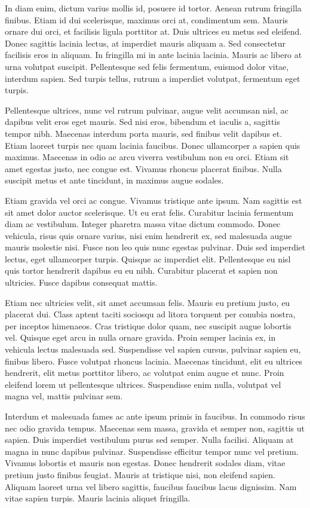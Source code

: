 \documentclass[a4paper,12pt]{report}
\begin{document}
In diam enim, dictum varius mollis id, posuere id tortor. Aenean rutrum fringilla finibus. Etiam id dui scelerisque, maximus orci at, condimentum sem. Mauris ornare dui orci, et facilisis ligula porttitor at. Duis ultrices eu metus sed eleifend. Donec sagittis lacinia lectus, at imperdiet mauris aliquam a. Sed consectetur facilisis eros in aliquam. In fringilla mi in ante lacinia lacinia. Mauris ac libero at urna volutpat suscipit. Pellentesque sed felis fermentum, euismod dolor vitae, interdum sapien. Sed turpis tellus, rutrum a imperdiet volutpat, fermentum eget turpis.

Pellentesque ultrices, nunc vel rutrum pulvinar, augue velit accumsan nisl, ac dapibus velit eros eget mauris. Sed nisi eros, bibendum et iaculis a, sagittis tempor nibh. Maecenas interdum porta mauris, sed finibus velit dapibus et. Etiam laoreet turpis nec quam lacinia faucibus. Donec ullamcorper a sapien quis maximus. Maecenas in odio ac arcu viverra vestibulum non eu orci. Etiam sit amet egestas justo, nec congue est. Vivamus rhoncus placerat finibus. Nulla suscipit metus et ante tincidunt, in maximus augue sodales.

Etiam gravida vel orci ac congue. Vivamus tristique ante ipsum. Nam sagittis est sit amet dolor auctor scelerisque. Ut eu erat felis. Curabitur lacinia fermentum diam ac vestibulum. Integer pharetra massa vitae dictum commodo. Donec vehicula, risus quis ornare varius, nisi enim hendrerit ex, sed malesuada augue mauris molestie nisi. Fusce non leo quis nunc egestas pulvinar. Duis sed imperdiet lectus, eget ullamcorper turpis. Quisque ac imperdiet elit. Pellentesque eu nisl quis tortor hendrerit dapibus eu eu nibh. Curabitur placerat et sapien non ultricies. Fusce dapibus consequat mattis.

Etiam nec ultricies velit, sit amet accumsan felis. Mauris eu pretium justo, eu placerat dui. Class aptent taciti sociosqu ad litora torquent per conubia nostra, per inceptos himenaeos. Cras tristique dolor quam, nec suscipit augue lobortis vel. Quisque eget arcu in nulla ornare gravida. Proin semper lacinia ex, in vehicula lectus malesuada sed. Suspendisse vel sapien cursus, pulvinar sapien eu, finibus libero. Fusce volutpat rhoncus lacinia. Maecenas tincidunt, elit eu ultrices hendrerit, elit metus porttitor libero, ac volutpat enim augue et nunc. Proin eleifend lorem ut pellentesque ultrices. Suspendisse enim nulla, volutpat vel magna vel, mattis pulvinar sem.

Interdum et malesuada fames ac ante ipsum primis in faucibus. In commodo risus nec odio gravida tempus. Maecenas sem massa, gravida et semper non, sagittis ut sapien. Duis imperdiet vestibulum purus sed semper. Nulla facilisi. Aliquam at magna in nunc dapibus pulvinar. Suspendisse efficitur tempor nunc vel pretium. Vivamus lobortis et mauris non egestas. Donec hendrerit sodales diam, vitae pretium justo finibus feugiat. Mauris at tristique nisi, non eleifend sapien. Aliquam laoreet urna vel libero sagittis, faucibus faucibus lacus dignissim. Nam vitae sapien turpis. Mauris lacinia aliquet fringilla.
\end{document}
